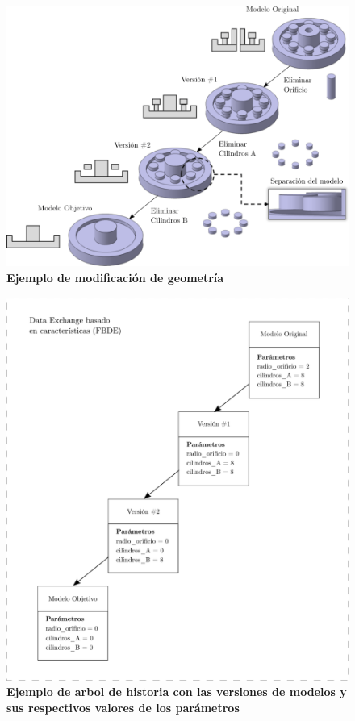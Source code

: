 \begin{figure}[h]
\includegraphics[width=14cm]{Img/WEB/de2.png}
\centering
\caption{\textbf{\footnotesize{Ejemplo de modificación de geometría}}}
\label{fig:de2}
\end{figure}

\begin{figure}[h]
\includegraphics[width=12cm]{Img/WEB/de3.png}
\centering
\caption{\textbf{\footnotesize{Ejemplo de arbol de historia con las versiones de modelos y sus respectivos valores de los parámetros}}}
\label{fig:de3}
\end{figure}

